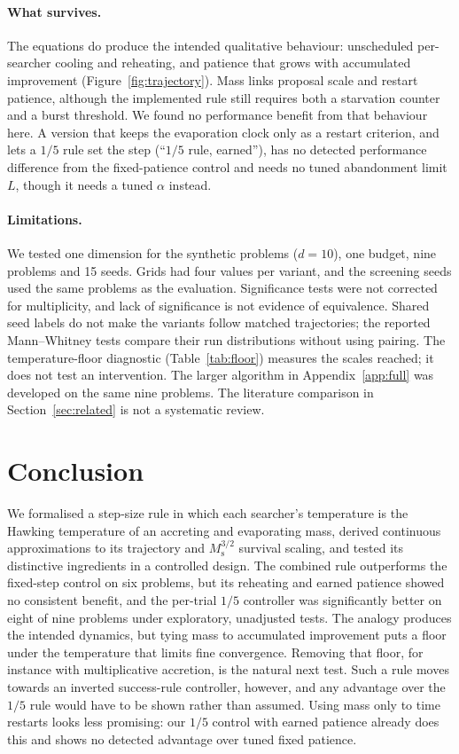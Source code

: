\documentclass[10pt,a4paper]{article}
\newcommand{\Ms}{M_{\mathrm{s}}}
\begin{document}
\paragraph{What survives.} The equations do produce the intended qualitative behaviour:
unscheduled per-searcher cooling and reheating, and patience that grows with
accumulated improvement (Figure~\ref{fig:trajectory}). Mass links proposal scale and restart patience, although the implemented rule
still requires both a starvation counter and a burst threshold. We found
no performance benefit from that behaviour here. A version that keeps the
evaporation clock only as a restart criterion, and lets a $1/5$ rule set the step
(``$1/5$ rule, earned''), has no detected performance difference from the fixed-patience control and needs no tuned
abandonment limit $L$, though it needs a tuned $\alpha$ instead.

\paragraph{Limitations.} We tested one dimension for the synthetic problems ($d=10$),
one budget, nine problems and 15 seeds. Grids had four values per variant, and the
screening seeds used the same problems as the evaluation. Significance tests were not
corrected for multiplicity, and lack of significance is not evidence of equivalence.
Shared seed labels do not make the variants follow matched trajectories; the
reported Mann--Whitney tests compare their run distributions without using pairing.
The temperature-floor diagnostic (Table~\ref{tab:floor}) measures the scales
reached; it does not test an intervention. The larger algorithm in Appendix~\ref{app:full} was
developed on the same nine problems. The literature comparison in
Section~\ref{sec:related} is not a systematic review.

\section{Conclusion}

We formalised a step-size rule in which each searcher's temperature is the Hawking
temperature of an accreting and evaporating mass, derived continuous approximations to its trajectory and
$\Ms^{3/2}$ survival scaling, and tested its distinctive ingredients in a controlled design.
The combined rule outperforms the fixed-step control on six problems, but its reheating and earned
patience showed no consistent benefit, and the per-trial $1/5$ controller was
significantly better on eight of nine problems under exploratory, unadjusted tests.
The analogy produces the intended dynamics, but tying mass to accumulated
improvement puts a floor under the temperature that limits fine convergence.
Removing that floor, for instance with multiplicative accretion, is the natural
next test. Such a rule moves towards an inverted success-rule controller,
however, and any advantage over the $1/5$ rule would have to be shown rather
than assumed. Using mass only to time restarts looks less promising: our $1/5$
control with earned patience already does this and shows no detected advantage
over tuned fixed patience.
\end{document}

